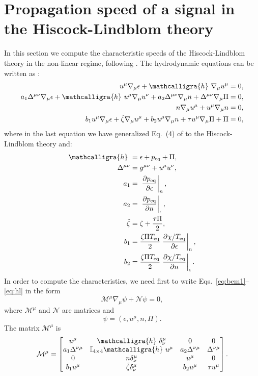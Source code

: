 \documentclass[aps,prd,twocolumn,a4paper,floatfix,nofootbib,superscriptaddress,nofootinbib]{revtex4}
\newcommand{\req}{\mathrm{eq}}
\newcommand{\hden}{\mathcalligra{h}\,\,}
\begin{document}
\section{Propagation speed of a signal in the Hiscock-Lindblom theory}
\label{sec:signal-speed}

In this section we compute the characteristic speeds of the
Hiscock-Lindblom theory in the non-linear regime, following \citet{Bemfica19}.
The hydrodynamic equations can be written as \citep{Bemfica19}:
%
\begin{align}
\label{eq:bem1}
u^\mu\nabla_\mu\epsilon + \hden\nabla_\mu u^\mu={}&0,\\
\label{eq:bem2}
a_1\Delta^{\mu\nu}\nabla_\mu\epsilon + \hden u^\mu\nabla_\mu u^\nu
+a_2\Delta^{\mu\nu}\nabla_\mu n+\Delta^{\mu\nu}\nabla_\mu\Pi={}&0,\\
\label{eq:bem3}
n \nabla_\mu u^\mu + u^\mu\nabla_\mu n={}&0,\\
\label{eq:hl}
b_1u^\mu\nabla_\mu\epsilon + \tilde\zeta\nabla_\mu u^\mu
+b_2u^\mu\nabla_\mu n + \tau u^\mu\nabla_\mu\Pi + \Pi={}&0,
\end{align}
%
where in the last equation we have generalized Eq.~(4) of \citet{Bemfica19}
to the Hiscock-Lindblom theory and:
%
\begin{align}
\hden={}&\epsilon+p_\req+\Pi,\\
\Delta^{\mu\nu}={}&g^{\mu\nu} + u^\mu u^\nu,\\
a_1={}&\left.\frac{\partial p_\req}{\partial\epsilon}\right|_n,\\
a_2={}&\left.\frac{\partial p_\req}{\partial n}\right|_\epsilon,\\
\tilde\zeta={}&\zeta + \frac{\tau\Pi}2,\\
b_1={}&\frac{\zeta\Pi T_\req}2\left.\frac{\partial \chi/ T_\req}{\partial\epsilon}\right|_n,\\
b_2={}&\frac{\zeta\Pi T_\req}2\left.\frac{\partial \chi/ T_\req}{\partial n}\right|_\epsilon.
\end{align}
%
In order to compute the characteristics, we need first to write Eqs.~\eqref{eq:bem1}--\eqref{eq:hl}
in the form
%
\begin{equation}
\mathcal M^\mu\nabla_\mu\psi + \mathcal N\psi=0,
\end{equation}
%
where $\mathcal M^\mu$ and $\mathcal N$ are matrices and
%
\begin{equation}
\psi=(\epsilon,u^\mu,n,\Pi).
\end{equation}
%
The matrix $\mathcal M^\mu$ is
%
\begin{equation}
\label{eq:mmatrix}
\mathcal M^\mu =
\begin{bmatrix}
u^\mu & \hden\delta_\nu^\mu & 0 & 0 \\
a_1\Delta^{\nu\mu} & \mathbb I_{4\times4}\hden u^\mu & a_2\Delta^{\nu\mu} & \Delta^{\nu\mu} \\
0 & n\delta_\nu^\mu & u^\mu & 0\\
b_1u^\mu & \tilde\zeta\delta_\nu^\mu & b_2u^\mu & \tau u^\mu
\end{bmatrix}.
\end{equation}
\end{document}
